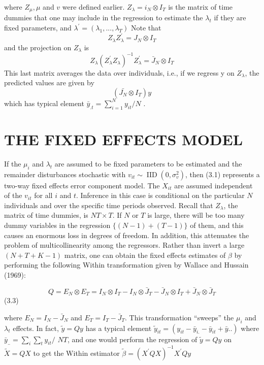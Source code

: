 \documentclass[
]{book}
\begin{document}
where \(Z_\mu, \mu\) and \(v\) were defined earlier. \(Z_\lambda = i_N \otimes I_T\) is the matrix of time dummies that one may include in the regression to estimate the \(\lambda_t\) if they are fixed parameters, and \(\lambda^{\prime}= (\lambda_1, ..., \lambda_T )\) Note that \[Z_\lambda Z_\lambda^ {\prime}=J_N \otimes I_T \] and the projection on \(Z_{\lambda}\) is \[Z_{\lambda}\left(Z_{\lambda}^{\prime} Z_{\lambda}\right)^{-1} Z_{\lambda}^{\prime}=\bar{J}_{N} \otimes I_T  \] This last matrix averages the data over individuals, i.e., if we regress y on \(Z_\lambda\), the predicted values are given by \[ (\bar {J_N} \otimes I_T)y \] which has typical element \(\bar{y}_{. t}=\sum_{i=1}^{N} y_{i t} / N\) .

\hypertarget{the-fixed-effects-model-1}{%
\section{THE FIXED EFFECTS MODEL}\label{the-fixed-effects-model-1}}

If the \(\mu_{i}\) and \(\lambda_{t}\) are assumed to be fixed parameters to be estimated and the remainder disturbances stochastic with \(v_{i t} \sim \operatorname{IID}\left(0, \sigma_{v}^{2}\right)\), then (3.1) represents a two-way fixed effects error component model. The \(X_{i t}\) are assumed independent of the \(v_{i t}\) for all \(i\) and \(t\). Inference in this case is conditional on the particular \(N\) individuals and over the specific time periods observed. Recall that \(Z_{\lambda}\), the matrix of time dummies, is \(N T \times T\). If \(N\) or \(T\) is large, there will be too many dummy variables in the regression \(\{(N-1)+(T-1)\}\) of them, and this causes an enormous loss in degrees of freedom. In addition, this attenuates the problem of multicollinearity among the regressors. Rather than invert a large \((N+T+K-1)\) matrix, one can obtain the fixed effects estimates of \(\beta\) by performing the following Within transformation given by Wallace and Hussain (1969):

\begin{equation}
Q=E_{N} \otimes E_{T}=I_{N} \otimes I_{T}-I_{N} \otimes \bar{J}_{T}-\bar{J}_{N} \otimes I_{T}+\bar{J}_{N} \otimes \bar{J}_{T}
\end{equation} (3.3)

where \(E_{N}=I_{N}-\bar{J}_{N}\) and \(E_{T}=I_{T}-\bar{J}_{T}\). This transformation ``sweeps'' the \(\mu_{i}\) and \(\lambda_{t}\) effects. In fact, \(\tilde{y}=Q y\) has a typical element \(\tilde{y}_{i t}=\left(y_{i t}-\bar{y}_{i .}-\bar{y}_{i t}+\bar{y} . .\right)\) where \(\bar{y}_{. .}=\sum_{i} \sum_{t} y_{i t} /\) \(N T\), and one would perform the regression of \(\tilde{y}=Q y\) on \(\widetilde{X}=Q X\) to get the Within estimator \(\widetilde{\beta}=\left(X^{\prime} Q X\right)^{-1} X^{\prime} Q y\)
\end{document}
